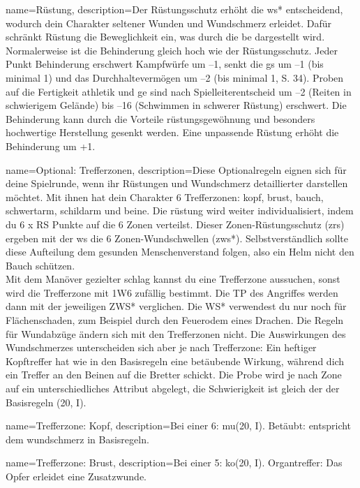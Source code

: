 {
    name={Rüstung},
description={Der Rüstungsschutz erhöht die \gls{ws*} entscheidend, wodurch dein Charakter seltener Wunden und Wundschmerz erleidet. Dafür schränkt Rüstung die Beweglichkeit ein, was durch die \gls{be} dargestellt wird. Normalerweise ist die Behinderung gleich hoch wie der Rüstungsschutz. Jeder Punkt Behinderung erschwert Kampfwürfe um –1, senkt die \gls{gs} um –1 (bis minimal 1) und das Durchhaltevermögen um –2 (bis minimal 1, S. 34). Proben auf die Fertigkeit \gls{athletik} und \gls{ge} sind nach Spielleiterentscheid um –2 (Reiten in schwierigem Gelände) bis –16 (Schwimmen in schwerer Rüstung) erschwert. Die Behinderung kann durch die Vorteile \gls{rüstungsgewöhnung} und besonders hochwertige Herstellung gesenkt werden. Eine unpassende Rüstung erhöht die Behinderung um +1.}}

{
    name={Optional: Trefferzonen},
    description={Diese Optionalregeln eignen sich für deine Spielrunde, wenn ihr Rüstungen und Wundschmerz detaillierter darstellen möchtet. Mit ihnen hat dein Charakter 6 Trefferzonen: \gls{kopf}, \gls{brust}, \gls{bauch}, \gls{schwertarm}, \gls{schildarm} und \gls{beine}. Die \gls{rüstung} wird weiter individualisiert, indem du 6 x RS Punkte auf die 6 Zonen verteilst. Dieser Zonen-Rüstungsschutz (\gls{zrs}) ergeben mit der \gls{ws} die 6 Zonen-Wundschwellen (\gls{zws*}). Selbstverständlich sollte diese Aufteilung dem gesunden Menschenverstand folgen, also ein Helm nicht den Bauch schützen.\\
Mit dem Manöver \gls{gezielter schlag} kannst du eine Trefferzone aussuchen, sonst wird die Trefferzone mit 1W6 zufällig bestimmt. Die TP des Angriffes werden dann mit der jeweiligen ZWS* verglichen. Die WS* verwendest du nur noch für Flächenschaden, zum Beispiel durch den Feuerodem eines Drachen. Die Regeln für Wundabzüge ändern sich mit den Trefferzonen nicht. Die Auswirkungen des Wundschmerzes unterscheiden sich aber je nach Trefferzone: Ein heftiger Kopftreffer hat wie in den Basisregeln eine betäubende Wirkung, während dich ein Treffer an den Beinen auf die Bretter schickt. Die Probe wird je nach Zone auf ein unterschiedliches Attribut abgelegt, die Schwierigkeit ist gleich der der Basisregeln (20, I).}}

{
    name={Trefferzone: Kopf},
    description={Bei einer 6: \gls{mu}(20, I). Betäubt: entspricht dem \gls{wundschmerz} in Basisregeln.}}

{
    name={Trefferzone: Brust},
    description={Bei einer 5: \gls{ko}(20, I). Organtreffer: Das Opfer erleidet eine Zusatzwunde.}}

